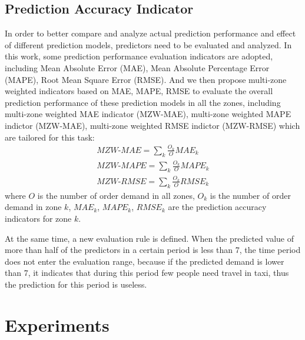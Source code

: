 \documentclass[sigconf]{acmart}
\begin{document}
\subsection{Prediction Accuracy Indicator}
In order to better compare and analyze actual prediction performance and effect of different prediction models, predictors need to be evaluated and analyzed. In this work, some prediction performance evaluation indicators are adopted, including Mean Absolute Error (MAE), Mean Absolute Percentage Error (MAPE), Root Mean Square Error (RMSE).
And we then propose multi-zone weighted indicators based on MAE, MAPE, RMSE to evaluate the overall prediction performance of these prediction models in all the zones, including multi-zone weighted MAE indicator (MZW-MAE), multi-zone weighted MAPE indictor (MZW-MAE), multi-zone weighted RMSE indictor (MZW-RMSE) which are tailored for this task:
\begin{equation}
  \begin{array}{c}{\textit{MZW-MAE}=\sum_{k} \frac{O_{k}}{O} MAE_{k}} \\ {\textit{MZW-MAPE}=\sum_{k} \frac{O_{k}}{O} MAPE_{k}} \\ {\textit{MZW-RMSE}=\sum_{k} \frac{O_{k}}{O} RMSE_{k}}\end{array}
\end{equation}
where $O$ is the number of order demand in all zones, $O_k$ is the number of order demand in zone $k$, ${MAE}_k$, ${MAPE}_k$, ${RMSE}_k$ are the prediction accuracy indicators for zone $k$.

At the same time, a new evaluation rule is defined. When the predicted value of more than half of the predictors in a certain period is less than 7, the time period does not enter the evaluation range, because if the predicted demand is lower than 7, it indicates that during this period few people need travel in taxi, thus the prediction for this period is useless.

\section{Experiments}
\end{document}
